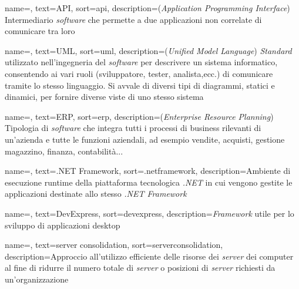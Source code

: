 
%

{
    name=,
    text=API,
    sort=api,
    description={(\emph{Application Programming Interface})
    Intermediario \textit{software} che permette a due
    applicazioni non correlate di comunicare tra loro}
}

{
    name=,
    text=UML,
    sort=uml,
    description={(\emph{Unified Model Language})
    \textit{Standard} utilizzato nell'ingegneria del \textit{software}
    per descrivere un sistema informatico, consentendo ai
    vari ruoli (sviluppatore, tester, analista,ecc.) di
    comunicare tramite lo stesso linguaggio. Si avvale di
    diversi tipi di diagrammi, statici e dinamici,
    per fornire diverse viste di uno stesso sistema \cite{site:def-uml}}
}

{
    name=,
    text=ERP,
    sort=erp,
    description={(\emph{Enterprise Resource Planning})
    Tipologia di \textit{software} che integra tutti i processi
    di business rilevanti di un'azienda e tutte le funzioni
    aziendali, ad esempio vendite, acquisti, gestione magazzino,
    finanza, contabilità... \cite{site:wiki}}
}

{
    name=,
    text=.NET Framework,
    sort=.netframework,
    description={Ambiente di esecuzione runtime
    della piattaforma tecnologica \textit{.NET} in cui
    vengono gestite le applicazioni destinate allo stesso
    \textit{.NET Framework} \cite{site:wiki}}
}

{
    name=,
    text=DevExpress,
    sort=devexpress,
    description={\textit{Framework} utile per lo sviluppo
    di applicazioni desktop \cite{site:devexpress-docs}}
}

{
    name=,
    text=server consolidation,
    sort=serverconsolidation,
    description={Approccio all'utilizzo efficiente
    delle risorse dei \textit{server} dei computer al fine di
    ridurre il numero totale di \textit{server} o posizioni di
    \textit{server} richiesti da un'organizzazione \cite{site:def-server-cons}}
}

